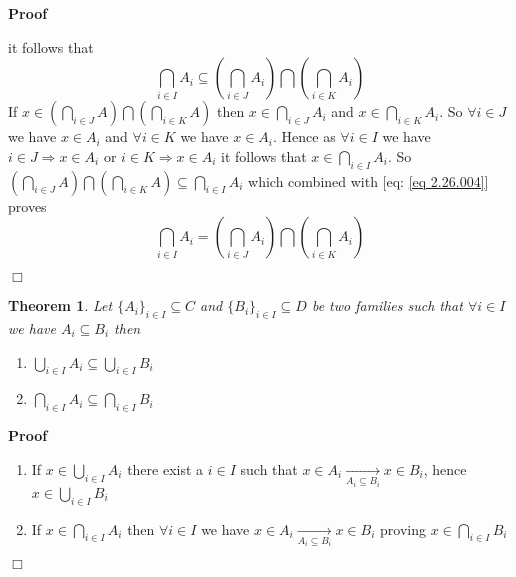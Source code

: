\documentclass{book}
\newcommand{\Rightarrowlim}{\mathop{\rightarrow}\limits}
\newenvironment{proof}{\noindent\textbf{Proof\ }}{\hspace*{\fill}$\Box$\medskip}
\newtheorem{theorem}{Theorem}
\begin{document}
\begin{proof}
\begin{enumerate}
\begin{enumerate}
      it follows that
      \begin{equation}
        \label{eq 2.26.004} \bigcap_{i \in I} A_i \subseteq \left( \bigcap_{i
        \in J} A_i \right) \bigcap \left( \bigcap_{i \in K} A_i \right)
      \end{equation}
      If $x \in \left( \bigcap_{i \in J} A \right) \bigcap \left( \bigcap_{i
      \in K} A \right)$ then $x \in \bigcap_{i \in J} A_i$ and $x \in
      \bigcap_{i \in K} A_i$. So $\forall i \in J$ we have $x \in A_i$ and
      $\forall i \in K$ we have $x \in A_i$. Hence as $\forall i \in I$ we
      have $i \in J \Rightarrow x \in A_i$ or $i \in K \Rightarrow x \in A_i$
      it follows that $x \in \bigcap_{i \in I} A_i$. So $\left( \bigcap_{i \in
      J} A \right) \bigcap \left( \bigcap_{i \in K} A \right) \subseteq
      \bigcap_{i \in I} A_i$ which combined with [eq: \ref{eq 2.26.004}]
      proves
      \[ \bigcap_{i \in I} A_i = \left( \bigcap_{i \in J} A_i \right) \bigcap
         \left( \bigcap_{i \in K} A_i \right) \]
    \end{enumerate}
  \end{enumerate}
  
\end{proof}

\begin{theorem}
  \label{family union intersection and inclusion}Let $\{ A_i \}_{i \in I}
  \subseteq C$ and $\{ B_i \}_{i \in I} \subseteq D$ be two families such that
  $\forall i \in I$ we have $A_i \subseteq B_i$ then
  \begin{enumerate}
    \item $\bigcup_{i \in I} A_i \subseteq \bigcup_{i \in I} B_i$
    
    \item $\bigcap_{i \in I} A_i \subseteq \bigcap_{i \in I} B_i$
  \end{enumerate}
\end{theorem}

\begin{proof}
  
  \begin{enumerate}
    \item If $x \in \bigcup_{i \in I} A_i$ there exist a $i \in I$ such that
    $x \in A_i \Rightarrowlim_{A_i \subseteq B_i} x \in B_i$, hence $x \in
    \bigcup_{i \in I} B_i$
    
    \item If $x \in \bigcap_{i \in I} A_i$ then $\forall i \in I$ we have $x
    \in A_i \Rightarrowlim_{A_i \subseteq B_i} x \in B_i$ proving $x \in
    \bigcap_{i \in I} B_i$
  \end{enumerate}
\end{proof}
\end{document}
